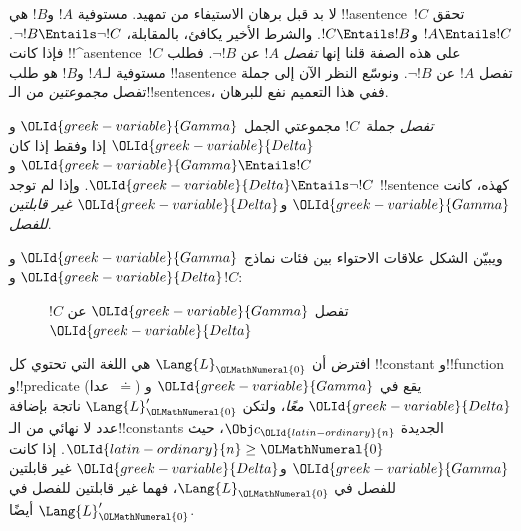 \documentclass[../../../include/open-logic-section]{subfiles}
\begin{document}


لا بد قبل برهان الاستيفاء من تمهيد. مستوفية
$!A$ و$!B$ هي !!a{sentence}~$!C$ تحقق $!A \Entails !C$
و$!C \Entails !B$. والشرط الأخير يكافئ، بالمقابلة،
$\lnot !B \Entails \lnot !C$. فإذا كانت !!^a{sentence}~$!C$
على هذه الصفة قلنا إنها \emph{تفصل} $!A$ عن $\lnot !B$.
فطلب مستوفية لـ$!A$ و$!B$ هو طلب !!a{sentence}
تفصل $!A$ عن $\lnot !B$. ونوسّع النظر الآن إلى جملة
تفصل \emph{مجموعتين} من الـ!!{sentence}s، ففي هذا
التعميم نفع للبرهان.

\begin{defn}
\emph{تفصل} جملة~$!C$ مجموعتي الجمل ${\OLId{greek-variable}{Gamma}}$ و${\OLId{greek-variable}{Delta}}$ إذا وفقط إذا كان
${\OLId{greek-variable}{Gamma}} \Entails !C$ و${\OLId{greek-variable}{Delta}} \Entails \lnot !C$. وإذا لم توجد
!!{sentence} كهذه، كانت ${\OLId{greek-variable}{Gamma}}$ و${\OLId{greek-variable}{Delta}}$ \emph{غير قابلتين للفصل}.
\end{defn}

ويبيّن الشكل علاقات الاحتواء بين فئات نماذج ${\OLId{greek-variable}{Gamma}}$ و${\OLId{greek-variable}{Delta}}$ و$!C$:
\begin{figure}[h]
  \centering
  \caption{$!C$ تفصل ${\OLId{greek-variable}{Gamma}}$ عن ${\OLId{greek-variable}{Delta}}$}
\end{figure}


\begin{lem}
افترض أن $\Lang{L}_{\OLMathNumeral{0}}$ هي اللغة التي تحتوي كل !!{constant} و!!{function}
و!!{predicate} (عدا~$\doteq$) يقع في ${\OLId{greek-variable}{Gamma}}$ و${\OLId{greek-variable}{Delta}}$ \emph{معًا}،
ولتكن $\Lang{L}'_{\OLMathNumeral{0}}$ ناتجة بإضافة عدد لا نهائي من الـ!!{constant}s الجديدة
$\Obj c_{\OLId{latin-ordinary}{n}}$، حيث ${\OLId{latin-ordinary}{n}} \ge {\OLMathNumeral{0}}$. إذا كانت ${\OLId{greek-variable}{Gamma}}$ و${\OLId{greek-variable}{Delta}}$ غير قابلتين
للفصل في $\Lang{L}_{\OLMathNumeral{0}}$، فهما غير قابلتين للفصل في $\Lang{L}'_{\OLMathNumeral{0}}$ أيضًا.
\end{lem}
\end{document}
